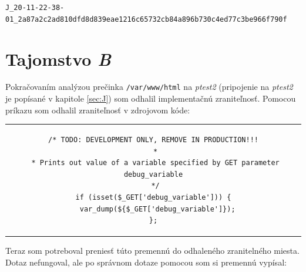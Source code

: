 \documentclass[11pt,a4paper]{article}
\begin{document}
\begin{center}
\small{\texttt{J\_20-11-22-38-01\_2a87a2c2ad810dfd8d839eae1216c65732cb84a896b730c4ed77c3be966f790f}}
\end{center}


\section{Tajomstvo \textit{B}}\label{sec:B}

Pokračovaním analýzou prečinka \texttt{/var/www/html} na \textit{ptest2} (pripojenie na \textit{ptest2} je popísané v kapitole \ref{sec:J}) som odhalil implementačnú zraniteľnosť.
Pomocou príkazu  som odhalil zraniteľnosť v zdrojovom kóde:

\begin{center}
\begin{tabular}{c}
\begin{lstlisting}[basicstyle=\footnotesize]
/* TODO: DEVELOPMENT ONLY, REMOVE IN PRODUCTION!!!
 *
 * Prints out value of a variable specified by GET parameter debug_variable
 */
if (isset($_GET['debug_variable'])) {
  var_dump(${$_GET['debug_variable']});
};
\end{lstlisting}
\end{tabular}
\end{center}

Na základe tejto zraniteľnosti ktorá bola dokonca i popísaná som sa snažil nájsť nejakú premennú ktorú by sa dalo vypísať pomocou tejto zraniteľnosti. Po ďalšej analýze ostatných zdrojových kódov ma zaujal súbor \texttt{internal-memo.php}. Pomocou príkazu \uv{\texttt{cat internal-memo.php}} som odhalil:

\begin{center}
\begin{tabular}{c}
\begin{lstlisting}[basicstyle=\footnotesize]
<?php echo $GLOBALS['INTERNAL_MSG']; ?>
\end{lstlisting}
\end{tabular}
\end{center}

Teraz som potreboval preniesť túto premennú do odhaleného zranitelného miesta. Dotaz  nefungoval, ale po správnom dotaze pomocou  som si premennú vypísal:
\end{document}
